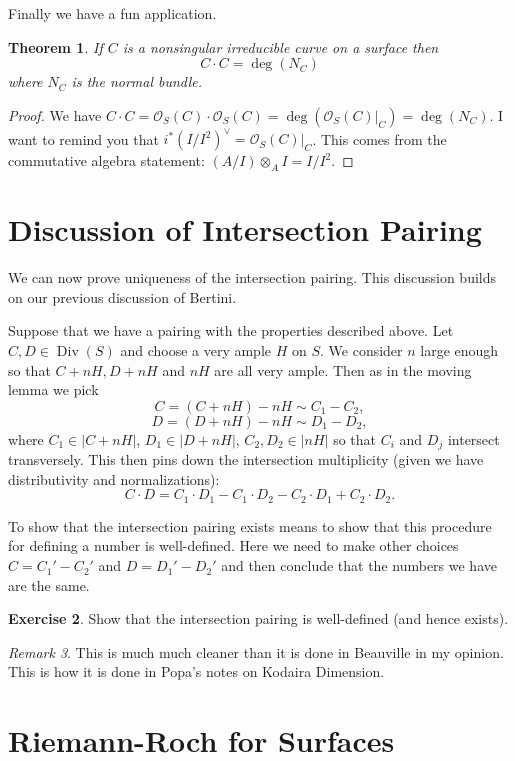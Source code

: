 \documentclass[12pt]{article}
\numberwithin{equation}{section}
\newtheorem{theorem}{Theorem}[subsection]
\theoremstyle{definition}
\newtheorem{exercise}[theorem]{Exercise}
\theoremstyle{remark}
\newtheorem{remark}[theorem]{Remark}
\newcommand{\Ocal}{\mathcal{O}}
\newcommand{\Div}{\operatorname{Div}}
\begin{document}
Finally we have a fun application. 
\begin{theorem}
	If $C$ is a nonsingular irreducible curve on a surface then 
	 $$ C\cdot C = \deg(N_C) $$
	where $N_C$ is the normal bundle. 
\end{theorem}
\begin{proof}
We have $C \cdot C = \Ocal_S(C) \cdot \Ocal_S(C) = \deg(\Ocal_S(C)\vert_C) = \deg(N_C)$.
I want to remind you that $i^*(I/I^2)^{\vee} =\Ocal_S(C)\vert_C$. 
This comes from the commutative algebra statement: $(A/I)\otimes_A I= I/I^2$.
\end{proof}

\section{Discussion of Intersection Pairing}
We can now prove uniqueness of the intersection pairing. 
This discussion builds on our previous discussion of Bertini. 

Suppose that we have a pairing with the properties described above. 
Let $C,D\in \Div(S)$ and choose a very ample $H$ on $S$.
We consider $n$ large enough so that $C+nH, D+nH$ and $nH$ are all very ample. 
Then as in the moving lemma we pick
 $$ C = (C+nH)-nH \sim  C_1 - C_2, $$
 $$ D = (D+nH)-nH \sim D_1-D_2, $$
where $C_1 \in \vert C+nH \vert$, $D_1 \in \vert D+nH\vert$, $C_2,D_2\in \vert nH \vert$ so that $C_i$ and $D_j$ intersect transversely. 
This then pins down the intersection multiplicity (given we have distributivity and normalizations):
 $$ C\cdot D = C_1\cdot D_1 - C_1 \cdot D_2 - C_2 \cdot D_1 + C_2\cdot D_2.$$

To show that the intersection pairing exists means to show that this procedure for defining a number is well-defined.
Here we need to make other choices $C=C_1'-C_2'$ and $D=D_1'-D_2'$ and then conclude that the numbers we have are the same. 

\begin{exercise}
	Show that the intersection pairing is well-defined (and hence exists).
\end{exercise}

\begin{remark}
	This is much much cleaner than it is done in Beauville in my opinion. 
	This is how it is done in Popa's notes on Kodaira Dimension.
\end{remark}


\section{Riemann-Roch for Surfaces}
\end{document}
